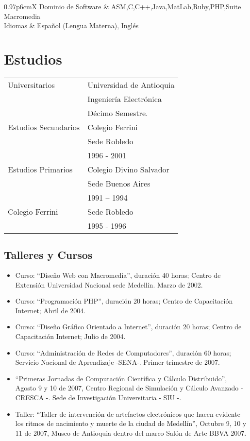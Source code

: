 \documentclass[a4paper, oneside, final, letter]{scrartcl}
\begin{document}
\begin{center}
\vspace{20pt}
\begin{tabularx}{0.97\linewidth}{p{6cm}X}
 Dominio de Software & ASM,C,C++,Java,MatLab,Ruby,PHP,Suite Macromedia \\
 Idiomas & Espa\~nol (Lengua Materna), Ingl\'es
\end{tabularx}
\section{Estudios}
\begin{tabularx}{0.97\linewidth}{p{6cm}X}
Universitarios & Universidad de Antioquia \\
& Ingeniería Electr\'onica \\
& D\'ecimo Semestre.\\
Estudios Secundarios & Colegio Ferrini\\
 & Sede Robledo\\
 & 1996 - 2001 \\
Estudios Primarios & Colegio Divino Salvador \\
& Sede Buenos Aires\\
& 1991 – 1994\\
Colegio Ferrini & Sede Robledo\\
& 1995 - 1996
\end{tabularx}
\subsection{Talleres y Cursos}
\begin{itemize}
\item Curso: “Dise\~no Web con Macromedia”, duraci\'on 40 horas; Centro de Extensi\'on Universidad Nacional sede Medellín.
Marzo de 2002.

\item Curso: “Programaci\'on PHP”, duración 20 horas; Centro de Capacitaci\'on Internet; Abril de 2004.
\item Curso: “Dise\~no Gr\'afico Orientado a Internet”, duración 20 horas; Centro de Capacitación Internet; Julio de 2004.
\item Curso: “Administraci\'on de Redes de Computadores”, duración 60 horas; Servicio Nacional de Aprendizaje -SENA-.
Primer trimestre de 2007.
\item “Primeras Jornadas de Computaci\'on Cient\'ifica y C\'alculo Distribuido”, Agosto 9 y 10 de 2007, Centro Regional de Simulación y Cálculo Avanzado - CRESCA -. Sede de Investigaci\'on Universitaria - SIU -.
\item Taller: “Taller de intervenci\'on de artefactos electr\'onicos que hacen evidente los ritmos de nacimiento y muerte de la ciudad de Medell\'in”, Octubre 9, 10 y 11 de 2007, Museo de Antioquia dentro del marco Sal\'on de Arte BBVA 2007.
 

\end{itemize}
\end{center}
\end{document}

